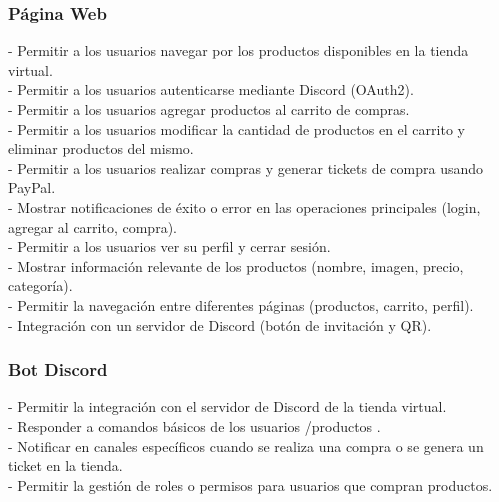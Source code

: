 \documentclass[a4paper,12pt]{article}
\begin{document}
\subsubsection{Página Web}

- Permitir a los usuarios navegar por los productos disponibles en la tienda virtual.\\

- Permitir a los usuarios autenticarse mediante Discord (OAuth2).\\

- Permitir a los usuarios agregar productos al carrito de compras.\\

- Permitir a los usuarios modificar la cantidad de productos en el carrito y eliminar productos del mismo.\\

- Permitir a los usuarios realizar compras y generar tickets de compra usando PayPal.\\

- Mostrar notificaciones de éxito o error en las operaciones principales (login, agregar al carrito, compra).\\

- Permitir a los usuarios ver su perfil y cerrar sesión.\\

- Mostrar información relevante de los productos (nombre, imagen, precio, categoría).\\

- Permitir la navegación entre diferentes páginas (productos, carrito, perfil).\\

- Integración con un servidor de Discord (botón de invitación y QR).\\

\subsubsection{Bot Discord}
- Permitir la integración con el servidor de Discord de la tienda virtual.\\

- Responder a comandos básicos de los usuarios /productos .\\

- Notificar en canales específicos cuando se realiza una compra o se genera un ticket en la tienda.\\

- Permitir la gestión de roles o permisos para usuarios que compran productos.\\
\end{document}
